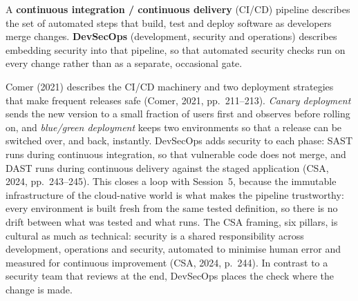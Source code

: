 \begin{definition}\label{def:devsecops}
A \textbf{continuous integration / continuous delivery} (CI/CD) pipeline
describes the set of automated steps that build, test and deploy software as
developers merge changes. \textbf{DevSecOps} (development, security and
operations) describes embedding security into that pipeline, so that automated
security checks run on every change rather than as a separate, occasional
gate.
\end{definition}

Comer (2021) describes the CI/CD machinery and two deployment strategies
that make frequent releases safe (Comer, 2021, pp.~211--213). \emph{Canary
deployment} sends the new version to a small fraction of users first and
observes before rolling on, and \emph{blue/green deployment} keeps two
environments so that a release can be switched over, and back, instantly.
DevSecOps adds security to each phase: SAST runs during continuous
integration, so that vulnerable code does not merge, and DAST runs during
continuous delivery against the staged application (CSA, 2024,
pp.~243--245). This closes a loop with Session~5, because the immutable
infrastructure of the cloud-native world is what makes the pipeline
trustworthy: every environment is built fresh from the same tested
definition, so there is no drift between what was tested and what runs. The
CSA framing, six pillars, is cultural as much as technical: security is a
shared responsibility across development, operations and security,
automated to minimise human error and measured for continuous improvement
(CSA, 2024, p.~244). In contrast to a security team that reviews at the end,
DevSecOps places the check where the change is made.

